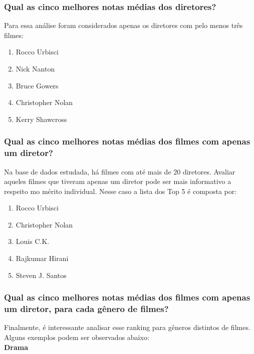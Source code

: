 \documentclass[a4paper, 12pt]{article} %
\begin{document}
\subsubsection{Qual as cinco melhores notas médias dos diretores?}

Para essa análise foram considerados apenas os diretores com pelo menos três filmes:

\begin{enumerate}[topsep=0pt,partopsep=0pt]
    \item Rocco Urbisci
    \item Nick Nanton
    \item Bruce Gowers
    \item Christopher Nolan
    \item Kerry Shawcross
\end{enumerate}



\subsubsection{Qual as cinco melhores notas médias dos filmes com apenas um diretor?}

Na base de dados estudada, há filmes com até mais de 20 diretores. Avaliar aqueles filmes que tiveram apenas um diretor pode ser mais informativo a respeito mo mérito individual. Nesse caso a lista dos Top 5 é composta por:\\

\begin{enumerate}[topsep=0pt,partopsep=0pt]
    \item Rocco Urbisci
    \item Christopher Nolan
    \item Louis C.K.
    \item Rajkumar Hirani
    \item Steven J. Santos
\end{enumerate}

\subsubsection{Qual as cinco melhores notas médias dos filmes com apenas um diretor, para cada gênero de filmes?}

Finalmente, é interessante analisar esse ranking para gêneros distintos de filmes. Alguns exemplos podem ser observados abaixo:\\

\textbf{Drama}
\newline
\end{document}
